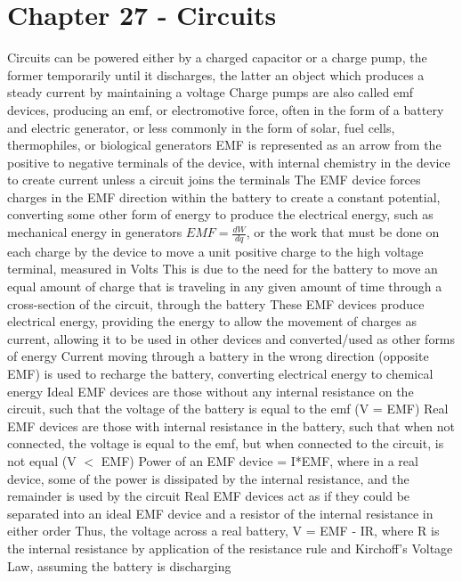 \documentclass[11 pt, twoside]{article}
\newenvironment{outline*}
{
	\begin{outline}[enumerate]
	}
	{\end{outline}
}
\begin{document}
\section{Chapter 27 - Circuits}
\begin{outline*}
\1 Circuits can be powered either by a charged capacitor or a charge pump, the former temporarily until it discharges, the latter an object which produces a steady current by maintaining a voltage
\2 Charge pumps are also called emf devices, producing an emf, or electromotive force, often in the form of a battery and electric generator, or less commonly in the form of solar, fuel cells, thermophiles, or biological generators
\2 EMF is represented as an arrow from the positive to negative terminals of the device, with internal chemistry in the device to create current unless a circuit joins the terminals
\2 The EMF device forces charges in the EMF direction within the battery to create a constant potential, converting some other form of energy to produce the electrical energy, such as mechanical energy in generators
\2 $EMF = \frac{dW}{dq}$, or the work that must be done on each charge by the device to move a unit positive charge to the high voltage terminal, measured in Volts
\3 This is due to the need for the battery to move an equal amount of charge that is traveling in any given amount of time through a cross-section of the circuit, through the battery
\2 These EMF devices produce electrical energy, providing the energy to allow the movement of charges as current, allowing it to be used in other devices and converted/used as other forms of energy
\2 Current moving through a battery in the wrong direction (opposite EMF) is used to recharge the battery, converting electrical energy to chemical energy
\1 Ideal EMF devices are those without any internal resistance on the circuit, such that the voltage of the battery is equal to the emf (V = EMF)
\2 Real EMF devices are those with internal resistance in the battery, such that when not connected, the voltage is equal to the emf, but when connected to the circuit, is not equal (V $<$ EMF)
\2 Power of an EMF device = I*EMF, where in a real device, some of the power is dissipated by the internal resistance, and the remainder is used by the circuit
\3 Real EMF devices act as if they could be separated into an ideal EMF device and a resistor of the internal resistance in either order
\3 Thus, the voltage across a real battery, V = EMF - IR, where R is the internal resistance by application of the resistance rule and Kirchoff's Voltage Law, assuming the battery is discharging

\end{outline*}
\end{document}
